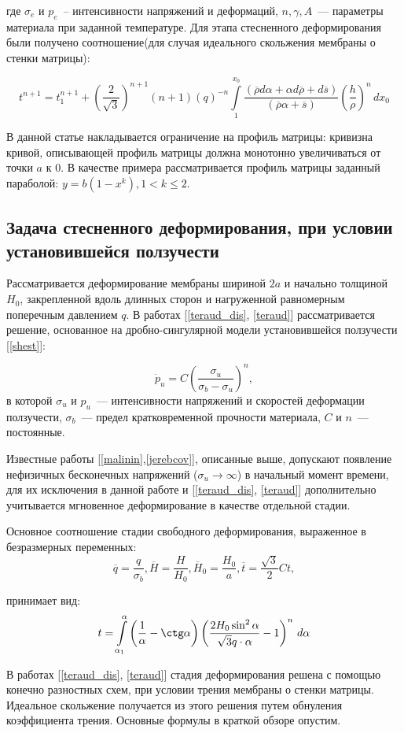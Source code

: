 где $\sigma_e$ и $p_e$~-- интенсивности напряжений и деформаций, $n, \gamma, A$~--- параметры материала при заданной температуре.
Для этапа стесненного деформирования были получено соотношение(для случая идеального скольжения мембраны о стенки матрицы): 

\begin{equation}
t^{n+1} = t_1^{n+1}+\left(\dfrac{2}{\sqrt 3}\right)^{n+1}(n+1)(q)^{-n}\int\limits_1^{x_0}\dfrac{(\overline{\rho} d\alpha + \alpha 
   d\overline{\rho}+d\overline{s})}{(\overline{\rho} \alpha + \overline{s})}\left(\dfrac{h}{\rho}\right)^n\, dx_0
\end{equation}

В данной статье накладывается ограничение на профиль матрицы: кривизна кривой, описывающей профиль
матрицы должна монотонно увеличиваться от точки $a$ к $0$.
 В качестве примера рассматривается профиль матрицы заданный параболой: $y= b(1-x^k), 1<k\leqslant 2$. 

\subsection{Задача стесненного деформирования, при условии установившейся ползучести}
Рассматривается деформирование мембраны шириной $2a$ и начально толщиной $H_0$, закрепленной вдоль длинных сторон и нагруженной равномерным поперечным давлением $q$.
В работах [\ref{teraud_dis}, \ref{teraud}] рассматривается решение, основанное на дробно-сингулярной модели установившейся ползучести [\ref{shest}]:

 \begin{equation}
  \dot{p}_u = C \left( \frac{\sigma_u}{\sigma_b - \sigma_u} \right)^n, 
 \end{equation}
в которой $\sigma_u$ и $\textit{\.{p}}_u$~--- интенсивности напряжений и скоростей деформации ползучести, $\sigma_b$~--- предел кратковременной прочности материала, $C$ и $n$~--- постоянные.


 Известные работы [\ref{malinin},\ref{jerebcov}], описанные выше, допускают появление нефизичных бесконечных напряжений ($\sigma_u \to \infty$) в начальный момент времени, для их исключения в данной работе и [\ref{teraud_dis}, \ref{teraud}] дополнительно учитывается мгновенное деформирование в качестве отдельной стадии.
 
 Основное соотношение стадии свободного деформирования, выраженное в безразмерных переменных:
 \begin{equation}
	\overline{q} = \dfrac{q}{\sigma_b}, \overline{H} = \dfrac{H}{H_0}, \overline{H}_0 = \dfrac{H_0}{a}, \overline{t} = \dfrac{\sqrt 3}{2}Ct, 
 \end{equation}   

принимает вид:
\begin{equation}
t=\int\limits_{\alpha_1}^{\alpha}\left(\dfrac{1}{\alpha}-\ctg \alpha\right)\left(\dfrac{2H_0\sin^2\alpha}{\sqrt 3 q \cdot \alpha}-1\right)^n \, d\alpha
\end{equation}   

В работах [\ref{teraud_dis}, \ref{teraud}] стадия деформирования решена с помощью конечно разностных схем, при условии трения 
мембраны о стенки матрицы. Идеальное скольжение получается из этого решения путем обнуления коэффициента трения.
Основные формулы в краткой обзоре опустим.
